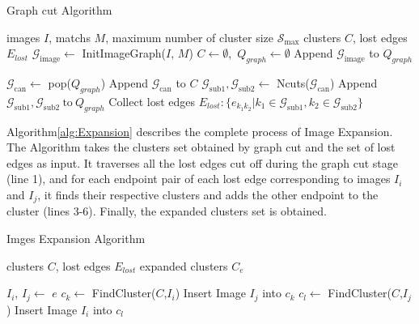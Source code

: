 \documentclass[runningheads]{llncs}
\begin{document}
\begin{algorithm}[h]
\caption{Graph cut Algorithm}
\label{alg:Graph_cut}
\begin{algorithmic}[1]
\Require images $I$, matchs $M$, maximum number of cluster size $\mathcal{S}_{\text{max}}$
\Ensure clusters $C$, lost edges $E_{lost}$
\State $\mathcal{G}_{\text{image}} \gets$ InitImageGraph($I$, $M$)   
\State $C \gets \emptyset$,\ $Q_{graph} \gets \emptyset$     
\State Append $\mathcal{G}_{\text{image}}$ to $Q_{graph}$

     \State $\mathcal{G}_{\text{can}} \gets$ pop($Q_{graph}$)   
        \State Append $\mathcal{G}_{\text{can}}$ to $C$
     \Else	
        \State $\mathcal{G}_{\text{sub1}},\mathcal{G}_{\text{sub2}} \gets$ Ncuts($\mathcal{G}_{\text{can}}$)
        \State Append $\mathcal{G}_{\text{sub1}},\mathcal{G}_{\text{sub2}} \ \text{to}\  Q_{graph}$
        \State Collect lost edges $E_{lost}: \{ e_{k_1 k_2} | k_1\in \mathcal{G}_{\text{sub1}}, k_2 \in \mathcal{G}_{\text{sub2}} \} $      
    \EndIf
\EndWhile
\end{algorithmic}
\end{algorithm}


Algorithm\ref{alg:Expansion} describes the complete process of Image Expansion. The Algorithm takes the clusters set obtained by graph cut and the set of lost edges as input. It traverses all the lost edges cut off during the graph cut stage (line 1), and for each endpoint pair of each lost edge corresponding to images $I_i$ and $I_j$, it finds their respective clusters and adds the other endpoint to the cluster (lines 3-6). Finally, the expanded clusters set is obtained.

\begin{algorithm}
\caption{Imges Expansion Algorithm}
\label{alg:Expansion}
\begin{algorithmic}[1]
\Require clusters $C$, lost edges $E_{lost}$
\Ensure expanded clusters $C_e$

    \State $I_i$, $I_j \gets$ $e$ 
    \State $c_k \gets$ FindCluster($C$,$I_i$) 
    \State Insert Image $I_j$ into $c_k$
    \State $c_l \gets$ FindCluster($C$,$I_j$) 
    \State Insert Image $I_i$ into $c_l$
\EndFor		
    
\end{algorithmic}
\end{algorithm}
\end{document}
